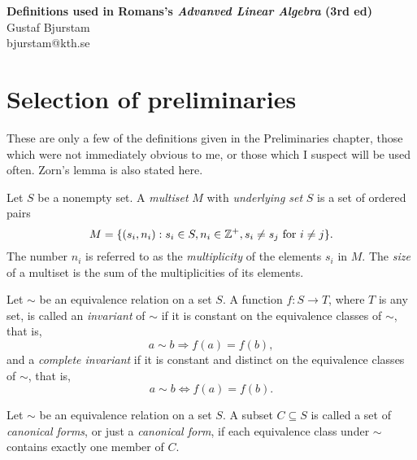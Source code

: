 \documentclass[12pt]{article}
\begin{document}
\begin{center}
\textbf{\large Definitions used in Romans's \textit{Advanved Linear Algebra} (3rd ed)} \\
Gustaf Bjurstam\\
bjurstam@kth.se\\
\end{center}

\setcounter{section}{-1}
\section{Selection of preliminaries}
These are only a few of the definitions given in the Preliminaries chapter, those which were not immediately obvious to me, or those which I suspect will be used often. Zorn's lemma is also stated here.
\begin{definition}[Multiset]
    Let $S$ be a nonempty set. A \textit{multiset} $M$ with \textit{underlying set} $S$ is a set of ordered pairs
    \begin{equation*}
        M=\{(s_i,n_i) : s_i\in S, n_i\in \mathbb{Z}^+, s_i\neq s_j \text{ for } i\neq j\}.
    \end{equation*}
    The number $n_i$ is referred to as the \textit{multiplicity} of the elements $s_i$ in $M$. The \textit{size} of a multiset is the sum of the multiplicities of its elements.
\end{definition}
\begin{definition}[Invariant]
    Let $\sim$ be an equivalence relation on a set $S$. A function $f:S\to T$, where $T$ is any set, is called an \textit{invariant} of $\sim$ if it is constant on the equivalence classes of $\sim$, that is, 
    \begin{equation*}
        a\sim b\Longrightarrow f(a)=f(b),
    \end{equation*}
    and a \textit{complete invariant} if it is constant and distinct on the equivalence classes of $\sim$, that is,
    \begin{equation*}
        a\sim b\Longleftrightarrow f(a)=f(b).
    \end{equation*}
\end{definition}
\begin{definition}
    Let $\sim$ be an equivalence relation on a set $S$. A subset $C\subseteq S$ is called a set of \textit{canonical forms}, or just a \textit{canonical form}, if  each equivalence class under $\sim$ contains exactly one member of $C$.
\end{definition}
\end{document}
